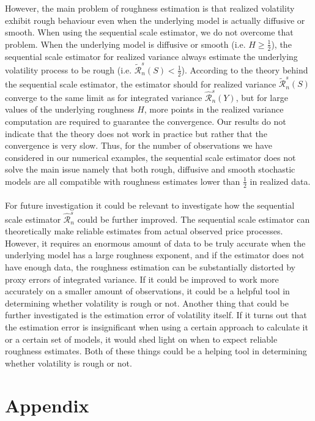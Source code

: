 \documentclass{article}
\begin{document}
However, the main problem of roughness estimation is that realized volatility exhibit rough behaviour even when the underlying model is actually diffusive or smooth. When using the sequential scale estimator, we do not overcome that problem. When the underlying model is diffusive or smooth (i.e. $H\geq \frac{1}{2}$), the sequential scale estimator for realized variance always estimate the underlying volatility process to be rough (i.e. $\widetilde{\mathscr{R}}_n^s(S)<\frac{1}{2}$). According to the theory behind the sequential scale estimator, the estimator should for realized variance $\widetilde{\mathscr{R}}_n^s(S)$ converge to the same limit as for integrated variance $\widehat{\mathscr{R}}_n^s(Y)$, but for large values of the underlying roughness $H$, more points in the realized variance computation are required to guarantee the convergence. Our results do not indicate that the theory does not work in practice but rather that the convergence is very slow. Thus, for the number of observations we have considered in our numerical examples, the sequential scale estimator does not solve the main issue namely that both rough, diffusive and smooth stochastic models are all compatible with roughness estimates lower than $\frac{1}{2}$ in realized data. \\\\
For future investigation it could be relevant to investigate how the sequential scale estimator $ \widehat{\mathscr{R}}_n^s $ could be further improved. The sequential scale estimator can theoretically make reliable estimates from actual observed price processes. However, it requires an enormous amount of data to be truly accurate when the underlying model has a large roughness exponent, and if the estimator does not have enough data, the roughness estimation can be substantially distorted by proxy errors of integrated variance. If it could be improved to work more accurately on a smaller amount of observations, it could be a helpful tool in determining whether volatility is rough or not. Another thing that could be further investigated is the estimation error of volatility itself. If it turns out that the estimation error is insignificant when using a certain approach to calculate it or a certain set of models, it would shed light on when to expect reliable roughness estimates. Both of these things could be a helping tool in determining whether volatility is rough or not.

\newpage
\section{Appendix}
\end{document}
